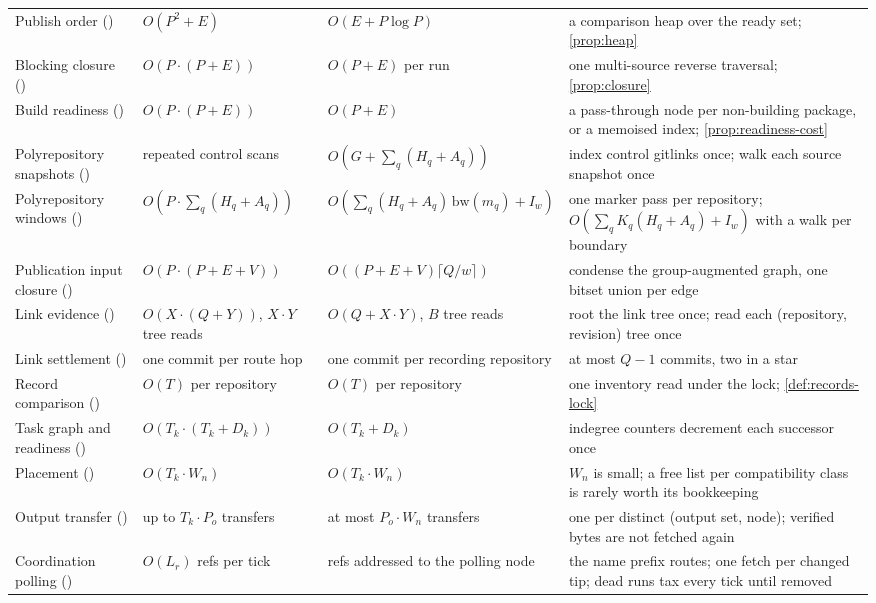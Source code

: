 \begin{center}
\begin{longtable}{@{}L{3.4cm}L{2.7cm}L{3.2cm}L{4.9cm}@{}}
Publish order () & $O(P^2 + E)$ & $O(E + P \log P)$ & a comparison heap over the ready set; \cref{prop:heap} \\
Blocking closure () & $O(P \cdot (P + E))$ & $O(P + E)$ per run & one multi-source reverse traversal; \cref{prop:closure} \\
Build readiness () & $O(P \cdot (P + E))$ & $O(P + E)$ & a pass-through node per non-building package, or a memoised index; \cref{prop:readiness-cost} \\
Polyrepository snapshots () & repeated control scans & $O(G + \sum_q (H_q + A_q))$ & index control gitlinks once; walk each source snapshot once \\
Polyrepository windows () & $O(P \cdot \sum_q (H_q + A_q))$ & $O(\sum_q (H_q + A_q)\,\mathrm{bw}(m_q) + I_w)$ & one marker pass per repository; $O(\sum_q K_q (H_q + A_q) + I_w)$ with a walk per boundary \\
Publication input closure () & $O(P \cdot (P + E + V))$ & $O((P + E + V)\lceil Q / w\rceil)$ & condense the group-augmented graph, one bitset union per edge \\
Link evidence () & $O(X \cdot (Q + Y))$, $X \cdot Y$ tree reads & $O(Q + X \cdot Y)$, $B$ tree reads & root the link tree once; read each (repository, revision) tree once \\
Link settlement () & one commit per route hop & one commit per recording repository & at most $Q - 1$ commits, two in a star \\
Record comparison () & $O(T)$ per repository & $O(T)$ per repository & one inventory read under the lock; \cref{def:records-lock} \\
Task graph and readiness () & $O(T_k \cdot (T_k + D_k))$ & $O(T_k + D_k)$ & indegree counters decrement each successor once \\
Placement () & $O(T_k \cdot W_n)$ & $O(T_k \cdot W_n)$ & $W_n$ is small; a free list per compatibility class is rarely worth its bookkeeping \\
Output transfer () & up to $T_k \cdot P_o$ transfers & at most $P_o \cdot W_n$ transfers & one per distinct (output set, node); verified bytes are not fetched again \\
Coordination polling () & $O(L_r)$ refs per tick & refs addressed to the polling node & the name prefix routes; one fetch per changed tip; dead runs tax every tick until removed \\
\bottomrule
\end{longtable}
\end{center}

